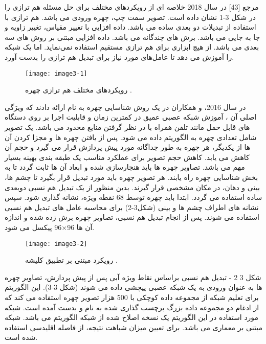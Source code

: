 مرجع [43] در سال 2018 خلاصه ای از رویکردهای مختلف برای حل مسئله هم ترازی را در شکل 3-1 نشان داده است. تصویر سمت چپ، چهره ورودی می باشد.  هم ترازی با استفاده از تبدیلات دو بعدی ساده می باشد.  داده افزایی  با تغییر مقیاس، تغییر زاویه و جا به جایی می باشد.  برش های چندگانه می باشد.  داده افزایی مبتنی بر روش های سه بعدی می باشد.  از هیچ ابزاری برای هم ترازی مستقیم استفاده نمی‌نماید. اما یک شبکه را آموزش می دهد تا عامل‌های مورد نیاز برای تبدیل هم ترازی را بدست آورد.
\begin{figure}[h]
\centering
  \texttt{[image: image3-1]}
  \caption{رویکردهای مختلف هم ترازی چهره \cite{ref1}.}
  \label{image2-1}
\end{figure}

\noindent
در سال 2016،  و همکاران در \cite{amos2016openface} یک روش شناسایی چهره به نام  ارائه دادند که ویژگی اصلی آن ، آموزش شبکه عصبی عمیق در کمترین زمان و قابلیت اجرا بر روی دستگاه های قابل حمل مانند تلفن همراه با در نظر گرفتن منابع محدود می باشد. یک تصویر شامل تعدادی چهره به الگوریتم داده می شود. پس از یافتن چهره ها و مجزا کردن  آن ها از یکدیگر، هر چهره به طور جداگانه مورد پیش پردازش  قرار می گیرد و حجم آن کاهش می یابد. کاهش حجم تصویر برای عملکرد مناسب یک طبقه بندی بهینه بسیار مهم می باشد. تصاویر چهره ها باید هنجارسازی شده و ابعاد آن ها ثابت گردد تا به بخش شناسایی چهره راه یابند.
هر تصویر چهره باید مورد تبدیل قرار بگیرد تا چشم ها، بینی و دهان، در مکان مشخصی قرار گیرند. بدین منظور از یک تبدیل هم نسبی  دوبعدی ساده استفاده می گردد. ابتدا باید چهره توسط 68 نقطه ویژه، نشانه گذاری شود. سپس نشانه های اطراف چشم ها و بینی (شکل3-2) برای محاسبه عامل های تبدیل هم نسبی استفاده می شوند. پس از انجام تبدیل هم نسبی، تصاویر چهره برش زده شده و اندازه آن ها 96×96 پیکسل می شود.
 \begin{figure}[h]
\centering
  \texttt{[image: image3-2]}
  \caption{رویکرد مبتنی بر تطبیق کلیشه  \cite{ref1}.}
  \label{image2-1}
\end{figure}
شکل ‏3 2 - تبدیل هم نسبی  براساس نقاط ویژه آبی 
پس از پیش پردازش، تصاویر چهره ها به عنوان ورودی به یک شبکه عصبی پیچشی داده می شوند (شکل 3-3). این الگوریتم برای تعلیم شبکه از مجموعه داده کوچکی با 500 هزار تصویر چهره استفاده می کند که از ادغام دو مجموعه داده بزرگ برچسب گذاری شده به نام  و  بدست آمده است. شبکه مورد استفاده در این الگوریتم یک نسخه اصلاح شده از شبکه  الگوریتم  می باشد. شبکه  مبتنی بر معماری  می باشد. برای تعیین میزان شباهت نتیجه، از فاصله اقلیدسی استفاده شده است.
